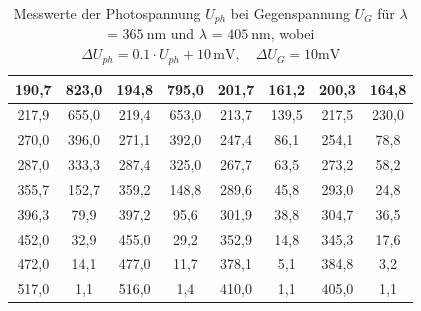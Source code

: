 \begin{table}[H]
{\begin{tabular}{|c|c|c|c|c|c|c|c|}
190,7           & 823,0             & 194,8         & 795,0            & 201,7           & 161,2          & 200,3         & 164,8          \\ \hline
217,9           & 655,0             & 219,4         & 653,0            & 213,7           & 139,5          & 217,5         & 230,0            \\ \hline
270,0             & 396,0             & 271,1         & 392,0            & 247,4           & 86,1           & 254,1         & 78,8           \\ \hline
287,0             & 333,3           & 287,4         & 325,0            & 267,7           & 63,5           & 273,2         & 58,2           \\ \hline
355,7           & 152,7           & 359,2         & 148,8          & 289,6           & 45,8           & 293,0           & 24,8           \\ \hline
396,3           & 79,9            & 397,2         & 95,6           & 301,9           & 38,8           & 304,7         & 36,5           \\ \hline
452,0             & 32,9            & 455,0           & 29,2           & 352,9           & 14,8           & 345,3         & 17,6           \\ \hline
472,0             & 14,1            & 477,0          & 11,7           & 378,1           & 5,1            & 384,8         & 3,2            \\ \hline
517,0             & 1,1             & 516,0           & 1,4            & 410,0             & 1,1            & 405,0           & 1,1            \\ \hline
\end{tabular}%
}
\caption{Messwerte der Photospannung $U_{ph}$ bei Gegenspannung $U_G$ für $\lambda$ = $\SI{365}{\nm}$ und $\lambda$ = $\SI{405}{\nm}$, wobei $\Delta U_{ph} = 0.1 \cdot U_{ph} + 10\,\si{\milli\volt}, \quad
 \Delta U_{G} = 10 \si{\milli\volt}$}
\label{tab:365and405}
\end{table}

